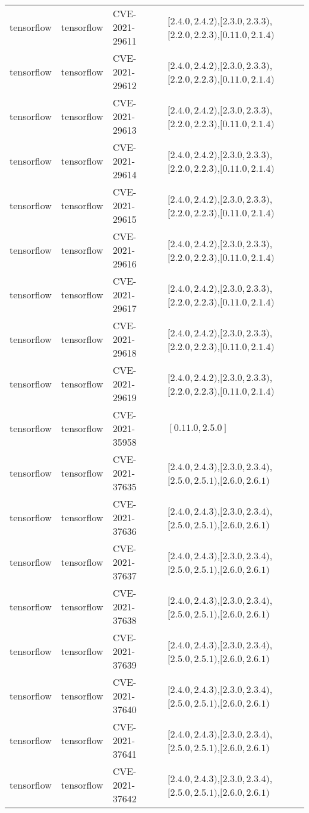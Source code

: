 \begin{tabular}{llll}
tensorflow & tensorflow & CVE-2021-29611 & $[2.4.0,2.4.2)$,$[2.3.0,2.3.3)$,$[2.2.0,2.2.3)$,$[0.11.0,2.1.4)$ \\
tensorflow & tensorflow & CVE-2021-29612 & $[2.4.0,2.4.2)$,$[2.3.0,2.3.3)$,$[2.2.0,2.2.3)$,$[0.11.0,2.1.4)$ \\
tensorflow & tensorflow & CVE-2021-29613 & $[2.4.0,2.4.2)$,$[2.3.0,2.3.3)$,$[2.2.0,2.2.3)$,$[0.11.0,2.1.4)$ \\
tensorflow & tensorflow & CVE-2021-29614 & $[2.4.0,2.4.2)$,$[2.3.0,2.3.3)$,$[2.2.0,2.2.3)$,$[0.11.0,2.1.4)$ \\
tensorflow & tensorflow & CVE-2021-29615 & $[2.4.0,2.4.2)$,$[2.3.0,2.3.3)$,$[2.2.0,2.2.3)$,$[0.11.0,2.1.4)$ \\
tensorflow & tensorflow & CVE-2021-29616 & $[2.4.0,2.4.2)$,$[2.3.0,2.3.3)$,$[2.2.0,2.2.3)$,$[0.11.0,2.1.4)$ \\
tensorflow & tensorflow & CVE-2021-29617 & $[2.4.0,2.4.2)$,$[2.3.0,2.3.3)$,$[2.2.0,2.2.3)$,$[0.11.0,2.1.4)$ \\
tensorflow & tensorflow & CVE-2021-29618 & $[2.4.0,2.4.2)$,$[2.3.0,2.3.3)$,$[2.2.0,2.2.3)$,$[0.11.0,2.1.4)$ \\
tensorflow & tensorflow & CVE-2021-29619 & $[2.4.0,2.4.2)$,$[2.3.0,2.3.3)$,$[2.2.0,2.2.3)$,$[0.11.0,2.1.4)$ \\
tensorflow & tensorflow & CVE-2021-35958 & $[0.11.0,2.5.0]$ \\
tensorflow & tensorflow & CVE-2021-37635 & $[2.4.0,2.4.3)$,$[2.3.0,2.3.4)$,$[2.5.0,2.5.1)$,$[2.6.0,2.6.1)$ \\
tensorflow & tensorflow & CVE-2021-37636 & $[2.4.0,2.4.3)$,$[2.3.0,2.3.4)$,$[2.5.0,2.5.1)$,$[2.6.0,2.6.1)$ \\
tensorflow & tensorflow & CVE-2021-37637 & $[2.4.0,2.4.3)$,$[2.3.0,2.3.4)$,$[2.5.0,2.5.1)$,$[2.6.0,2.6.1)$ \\
tensorflow & tensorflow & CVE-2021-37638 & $[2.4.0,2.4.3)$,$[2.3.0,2.3.4)$,$[2.5.0,2.5.1)$,$[2.6.0,2.6.1)$ \\
tensorflow & tensorflow & CVE-2021-37639 & $[2.4.0,2.4.3)$,$[2.3.0,2.3.4)$,$[2.5.0,2.5.1)$,$[2.6.0,2.6.1)$ \\
tensorflow & tensorflow & CVE-2021-37640 & $[2.4.0,2.4.3)$,$[2.3.0,2.3.4)$,$[2.5.0,2.5.1)$,$[2.6.0,2.6.1)$ \\
tensorflow & tensorflow & CVE-2021-37641 & $[2.4.0,2.4.3)$,$[2.3.0,2.3.4)$,$[2.5.0,2.5.1)$,$[2.6.0,2.6.1)$ \\
tensorflow & tensorflow & CVE-2021-37642 & $[2.4.0,2.4.3)$,$[2.3.0,2.3.4)$,$[2.5.0,2.5.1)$,$[2.6.0,2.6.1)$ \\

\end{tabular}
